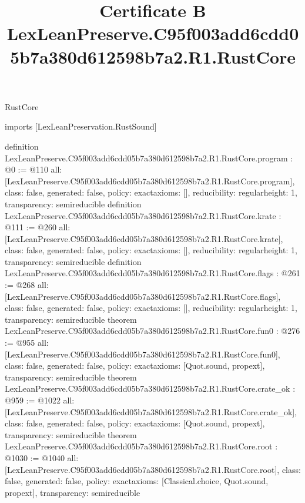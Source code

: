 \begin{lexlean}{RustCore}
\title{Certificate B LexLeanPreserve.C95f003add6cdd05b7a380d612598b7a2.R1.RustCore}
\begin{coremodule}
imports [LexLeanPreservation.RustSound]

definition LexLeanPreserve.C95f003add6cdd05b7a380d612598b7a2.R1.RustCore.program : @0 := @110 {
  all: [LexLeanPreserve.C95f003add6cdd05b7a380d612598b7a2.R1.RustCore.program],
  class: false,
  generated: false,
  policy: exact{axioms: []},
  reducibility: regular{height: 1},
  transparency: semireducible
}
definition LexLeanPreserve.C95f003add6cdd05b7a380d612598b7a2.R1.RustCore.krate : @111 := @260 {
  all: [LexLeanPreserve.C95f003add6cdd05b7a380d612598b7a2.R1.RustCore.krate],
  class: false,
  generated: false,
  policy: exact{axioms: []},
  reducibility: regular{height: 1},
  transparency: semireducible
}
definition LexLeanPreserve.C95f003add6cdd05b7a380d612598b7a2.R1.RustCore.flags : @261 := @268 {
  all: [LexLeanPreserve.C95f003add6cdd05b7a380d612598b7a2.R1.RustCore.flags],
  class: false,
  generated: false,
  policy: exact{axioms: []},
  reducibility: regular{height: 1},
  transparency: semireducible
}
theorem LexLeanPreserve.C95f003add6cdd05b7a380d612598b7a2.R1.RustCore.fun0 : @276 := @955 {
  all: [LexLeanPreserve.C95f003add6cdd05b7a380d612598b7a2.R1.RustCore.fun0],
  class: false,
  generated: false,
  policy: exact{axioms: [Quot.sound, propext]},
  transparency: semireducible
}
theorem LexLeanPreserve.C95f003add6cdd05b7a380d612598b7a2.R1.RustCore.crate_ok : @959 := @1022 {
  all: [LexLeanPreserve.C95f003add6cdd05b7a380d612598b7a2.R1.RustCore.crate_ok],
  class: false,
  generated: false,
  policy: exact{axioms: [Quot.sound, propext]},
  transparency: semireducible
}
theorem LexLeanPreserve.C95f003add6cdd05b7a380d612598b7a2.R1.RustCore.root : @1030 := @1040 {
  all: [LexLeanPreserve.C95f003add6cdd05b7a380d612598b7a2.R1.RustCore.root],
  class: false,
  generated: false,
  policy: exact{axioms: [Classical.choice, Quot.sound, propext]},
  transparency: semireducible
}


\end{coremodule}
\end{lexlean}
